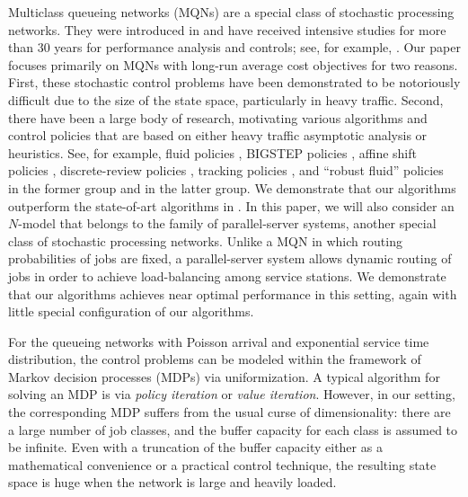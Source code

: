 \documentclass[11pt]{article}
\theoremstyle{definition}
\numberwithin{equation}{section}
\begin{document}
Multiclass queueing networks (MQNs) are a special class of stochastic
processing networks.  They were introduced in \cite{Harr1988} and have
received intensive studies for more than 30 years for performance
analysis and controls; see, for example, \cite{HarrNguy1993,
  KumaKuma1994, BertPascTsit1994, Bram1998a, Will1998,
  Bertsimas2011, Bertsimas2015, ChenMeyn1999, HendMeynTadi2003,
  Veatch2015}.  Our paper focuses primarily on MQNs  with long-run average  cost objectives for two reasons.
First, these stochastic control problems have been demonstrated to be
notoriously difficult due to the size of the state space, particularly
in heavy traffic. Second, there have been a large body of research,
motivating various algorithms and control policies that are based on
either heavy traffic asymptotic analysis or heuristics. See, for
example, fluid policies \cite{ChenYao1993}, BIGSTEP policies
\cite{Harr1996}, affine shift policies \cite{Meyn1997},
discrete-review policies \cite{Maglaras2000, AtaKuma2005}, tracking
policies \cite{Bauerle2001}, and ``robust fluid''
policies~\cite{Bertsimas2015} in the former group and
\cite{LuRamaKuma1994,KumaKuma1996} in the latter group.  We
demonstrate that our algorithms outperform the state-of-art algorithms
in \cite{Bertsimas2015}. In this paper, we will also consider an
$N$-model that belongs to the family of parallel-server systems,
another special class of stochastic processing networks.  Unlike a MQN
in which routing probabilities of jobs are fixed, a parallel-server
system allows dynamic routing of jobs in order to achieve
load-balancing among service stations.  We demonstrate that our
algorithms achieves near optimal performance in this setting, again
with little special configuration of our algorithms.



For the queueing networks with Poisson arrival and exponential service
time distribution, the control problems can be modeled within the
framework of Markov decision processes (MDPs) \cite{Puterman2005} via
uniformization.  A typical algorithm for solving an MDP is via \emph{policy
  iteration} or \emph{value iteration}.  However, in our setting, the corresponding MDP suffers
from the usual curse of dimensionality: there are a large number of
job classes, and the buffer capacity for each class is assumed to be
infinite. Even with a truncation of the buffer capacity either as a
mathematical convenience or a practical control technique, the
resulting state space is huge when the network is large and heavily
loaded.
\end{document}
